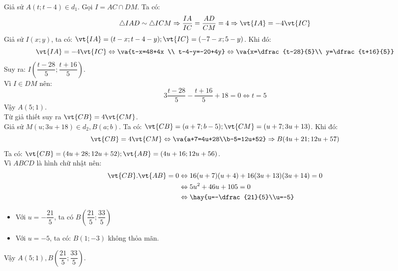 Giả sử $A(t;t-4) \in d_1$. Gọi $I = AC \cap DM$. Ta có: 
$$\triangle IAD \sim \triangle ICM \Rightarrow \dfrac{IA}{IC}
= \dfrac{AD}{CM} = 4 \Rightarrow \vt{IA}=-4\vt{IC}$$ 
Giả sử $I(x;y)$, ta có: $\vt{IA}=(t-x;t-4-y); \vt{IC}=(-7-x;5-y)$. Khi đó:
$$ \vt{IA}=-4\vt{IC} \Leftrightarrow \va{t-x=48+4x \\ t-4-y=-20+4y} \Leftrightarrow \va{x=\dfrac{t-28}{5}\\ y=\dfrac{t+16}{5}}$$
Suy ra: $I\left( \dfrac{t-28}{5}; \dfrac{t+16}{5}\right)$.\\
Vì $I \in DM$ nên:
$$3\dfrac{t-28}{5}-\dfrac{t+16}{5}+18=0 \Leftrightarrow t=5$$
Vậy $A(5;1)$.\\
Từ giả thiết suy ra $\vt{CB}=4\vt{CM}$.\\ Giả sử $M(u;3u+18) \in d_2, B(a;b)$. Ta có: $\vt{CB}=(a+7;b-5);\vt{CM}=(u+7;3u+13)$.  Khi đó:
$$\vt{CB}=4\vt{CM} \Leftrightarrow \va{a+7=4u+28\\b-5=12u+52} \Rightarrow B(4u+21;12u+57)$$
Ta có: $\vt{CB}=(4u+28;12u+52);\vt{AB}=(4u+16;12u+56)$.\\
Vì $ABCD$ là hình chữ nhật nên: 
\begin{align*}
\vt{CB}.\vt{AB}=0 & \Leftrightarrow 16(u+7)(u+4)+16(3u+13)(3u+14)=0 \\
& \Leftrightarrow 5u^2+46u+105=0 \\
&\Leftrightarrow \hay{u=-\dfrac{21}{5}\\u=-5}
\end{align*}
\begin{itemize}
\item Với $u=-\dfrac{21}{5}$, ta có $B\left(\dfrac{21}{5}; \dfrac{33}{5}\right)$
\item Với $u=-5$, ta có: $B(1;-3)$ không thỏa mãn.
\end{itemize}
Vậy $A(5;1), B\left(\dfrac{21}{5}; \dfrac{33}{5}\right)$.
 

